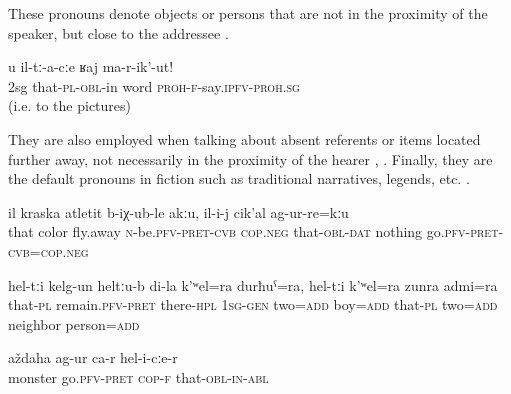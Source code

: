 These pronouns denote objects or persons that are not in the proximity of the speaker, but close to the addressee .
%
\begin{exe}
		\label{Do not talk to them! (i.e. to the pictures)}
	\sn
	\gll	u	il-tː-a-cːe	ʁaj	ma-r-ik'-ut!\\
		2sg	that-\textsc{pl}-\textsc{obl}-in	word	\textsc{proh}-\textsc{f}-say.\textsc{ipfv}-\textsc{proh.sg}\\
	\glt	{} (i.e. to the pictures)
\end{exe}

They are also employed when talking about absent referents or items located further away, not necessarily in the proximity of the hearer , . Finally, they are the default pronouns in fiction such as traditional narratives, legends, etc. .
%
\begin{exe}
		\label{The color does not fly off, nothing happened to it.}
	\sn
	\gll	il	kraska	atletit	b-iχ-ub-le akːu, 	il-i-j	cik'al	ag-ur-re=kːu\\
		that	color	fly.away	\textsc{n}-be.\textsc{pfv}-\textsc{pret}-\textsc{cvb} \textsc{cop.neg}	that-\textsc{obl}-\textsc{dat} nothing	go.\textsc{pfv}-\textsc{pret}-\textsc{cvb}=\textsc{cop.neg}\\
	\glt	{}

		\label{They remained there, my two sons and those two neighbors.}
	\sn
	\gll	hel-tːi	kelg-un	heltːu-b	di-la	k'ʷel=ra	durħuˁ=ra,	hel-tːi	k'ʷel=ra	zunra	admi=ra\\
		that-\textsc{pl}	remain.\textsc{pfv}-\textsc{pret}	there-\textsc{hpl}	\textsc{1sg-gen}	two=\textsc{add}	boy=\textsc{add}	that-\textsc{pl}	two=\textsc{add}	neighbor	person=\textsc{add}\\
	\glt	{}

	\ex	\label{She turned into a monster.}
	\gll	aždaha	ag-ur ca-r	hel-i-cːe-r \\
		monster	go.\textsc{pfv}-\textsc{pret} \textsc{cop-f}	that-\textsc{obl-in}-\textsc{abl}\\
	\glt	{}
\end{exe}


